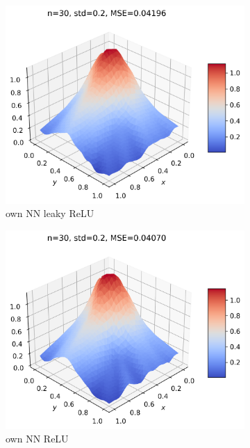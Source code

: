 \documentclass[11pt]{article}
\begin{document}
\begin{figure}[H]
\begin{subfigure}{.5\textwidth}
        \includegraphics[width=.92\textwidth]{../figures/NN_lrelu_franke.png}
        \caption{own NN leaky ReLU}
        \label{fig:}
    \end{subfigure}
    \begin{subfigure}{.5\textwidth}
        \centering
        \includegraphics[width=.92\textwidth]{../figures/NN_relu_franke.png}
        \caption{own NN ReLU}
        \label{fig:}
    \end{subfigure}
    \begin{subfigure}{.5\textwidth}
        \centering

\end{subfigure}
\end{figure}
\end{document}
